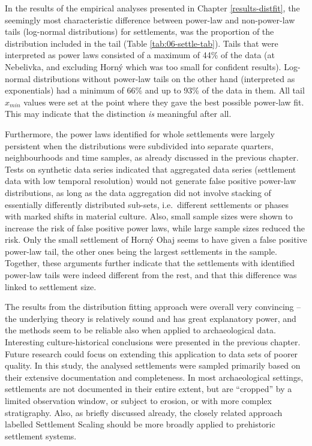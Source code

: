 \documentclass[
  12pt,
  a4paper, twoside]{book}
\begin{document}
In the results of the empirical analyses presented in Chapter \ref{results-distfit}, the seemingly most characteristic difference between power-law and non-power-law tails (log-normal distributions) for settlements, was the proportion of the distribution included in the tail (Table \ref{tab:06-settle-tab}). Tails that were interpreted as power laws consisted of a maximum of 44\% of the data (at Nebelivka, and excluding Horný which was too small for confident results). Log-normal distributions without power-law tails on the other hand (interpreted as exponentials) had a minimum of 66\% and up to 93\% of the data in them. All tail \(x_{min}\) values were set at the point where they gave the best possible power-law fit. This may indicate that the distinction \emph{is} meaningful after all.

Furthermore, the power laws identified for whole settlements were largely persistent when the distributions were subdivided into separate quarters, neighbourhoods and time samples, as already discussed in the previous chapter. Tests on synthetic data series indicated that aggregated data series (settlement data with low temporal resolution) would not generate false positive power-law distributions, as long as the data aggregation did not involve stacking of essentially differently distributed sub-sets, i.e.~different settlements or phases with marked shifts in material culture. Also, small sample sizes were shown to increase the risk of false positive power laws, while large sample sizes reduced the risk. Only the small settlement of Horný Ohaj seems to have given a false positive power-law tail, the other ones being the largest settlements in the sample. Together, these arguments further indicate that the settlements with identified power-law tails were indeed different from the rest, and that this difference was linked to settlement size.

The results from the distribution fitting approach were overall very convincing -- the underlying theory is relatively sound and has great explanatory power, and the methods seem to be reliable also when applied to archaeological data. Interesting culture-historical conclusions were presented in the previous chapter. Future research could focus on extending this application to data sets of poorer quality. In this study, the analysed settlements were sampled primarily based on their extensive documentation and completeness. In most archaeological settings, settlements are not documented in their entire extent, but are ``cropped'' by a limited observation window, or subject to erosion, or with more complex stratigraphy. Also, as briefly discussed already, the closely related approach labelled Settlement Scaling should be more broadly applied to prehistoric settlement systems.
\end{document}
